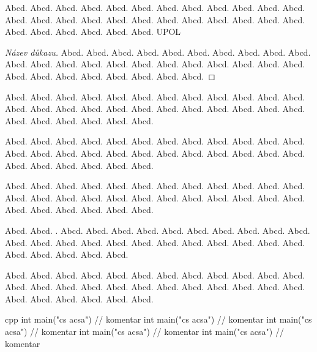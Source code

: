 \documentclass[12pt]{article}
\begin{document}

\begin{definition}
Abcd. Abcd. Abcd. Abcd. Abcd. Abcd. Abcd. Abcd. Abcd. Abcd. Abcd. Abcd. Abcd. Abcd. Abcd. Abcd. Abcd. Abcd. Abcd. Abcd. Abcd. Abcd. Abcd. Abcd. Abcd. Abcd. Abcd. Abcd. Abcd. Abcd. \gls{UPOL}
\end{definition}

\begin{proof}[Název důkazu]
Abcd. Abcd. Abcd. Abcd. Abcd. Abcd. Abcd. Abcd. Abcd. Abcd. Abcd. Abcd. Abcd. Abcd. Abcd. Abcd. Abcd. Abcd. Abcd. Abcd. Abcd. Abcd. Abcd. Abcd. Abcd. Abcd. Abcd. Abcd. Abcd. Abcd. 
\end{proof}

\begin{remark}
Abcd. Abcd. Abcd. Abcd. Abcd. Abcd. Abcd. Abcd. Abcd. Abcd. Abcd. Abcd. Abcd. Abcd. Abcd. Abcd. Abcd. Abcd. Abcd. Abcd. Abcd. Abcd. Abcd. Abcd. Abcd. Abcd. Abcd. Abcd. Abcd. Abcd. 
\end{remark}

\begin{example}
Abcd. Abcd. Abcd. Abcd. Abcd. Abcd. Abcd. Abcd. Abcd. Abcd. Abcd. Abcd. Abcd. Abcd. Abcd. Abcd. Abcd. Abcd. Abcd. Abcd. Abcd. Abcd. Abcd. Abcd. Abcd. Abcd. Abcd. Abcd. Abcd. Abcd. 
\end{example}

\begin{lemma}
Abcd. Abcd. Abcd. Abcd. Abcd. Abcd. Abcd. Abcd. Abcd. Abcd. Abcd. Abcd. Abcd. Abcd. Abcd. Abcd. Abcd. Abcd. Abcd. Abcd. Abcd. Abcd. Abcd. Abcd. Abcd. Abcd. Abcd. Abcd. Abcd. Abcd. 
\end{lemma}

\begin{consequence}
Abcd. Abcd. . Abcd. Abcd. Abcd. Abcd. Abcd. Abcd. Abcd. Abcd. Abcd. Abcd. Abcd. Abcd. Abcd. Abcd. Abcd. Abcd. Abcd. Abcd. Abcd. Abcd. Abcd. Abcd. Abcd. Abcd. Abcd. Abcd. Abcd. 
\end{consequence}

\begin{theorem}
Abcd. Abcd. Abcd. Abcd. Abcd. Abcd. Abcd. Abcd. Abcd. Abcd. Abcd. Abcd. Abcd. Abcd. Abcd. Abcd. Abcd. Abcd. Abcd. Abcd. Abcd. Abcd. Abcd. Abcd. Abcd. Abcd. Abcd. Abcd. Abcd. Abcd. 
\end{theorem}


\begin{upcode}{cpp}{}{\cpp}
int main("cs acsa") // komentar
int main("cs acsa") // komentar
int main("cs acsa") // komentar
int main("cs acsa") // komentar
int main("cs acsa") // komentar
\end{upcode}
\end{document}
